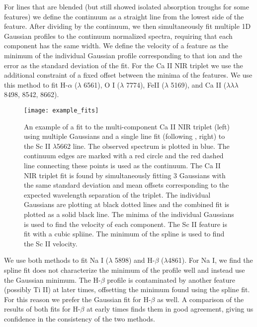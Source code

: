 \documentclass[preprint]{aastex61}
\begin{document}
For lines that are blended (but still showed isolated absorption troughs for some features) we define the continuum as a straight line from the lowest side of the feature. 
After dividing by the continuum, we then simultaneously fit multiple 1D Gaussian profiles to the continuum normalized spectra, requiring that each component has the same width.
We define the velocity of a feature as the minimum of the individual Gaussian profile corresponding to that ion and the error as the standard deviation of the fit. 
For the Ca II NIR triplet we use the additional constraint of a fixed offset between the minima of the features. 
We use this method to fit H-$\alpha$ ($\lambda$ 6561), O I ($\lambda$ 7774), FeII ($\lambda$ 5169), and Ca II ($\lambda\lambda\lambda$ 8498, 8542, 8662). 
\begin{figure}[htbp]
\begin{center}
\texttt{[image: example\_fits]}
\caption{An example of a fit to the multi-component Ca II NIR triplet (left) using multiple Gaussians and a single line fit (following \citet{2012silverman}, right) to the Sc II $\lambda$5662 line.
The observed spectrum is plotted in blue.
The continuum edges are marked with a red circle and the red dashed line connecting these points is used as the continuum. 
The Ca II NIR triplet fit is found by simultaneously fitting 3 Gaussians with the same standard deviation and mean offsets corresponding to the expected wavelength separation of the triplet. 
The individual Gaussians are plotting at black dotted lines and the combined fit is plotted as a solid black line. 
The minima of the individual Gaussians is used to find the velocity of each component.
The Sc II feature is fit with a cubic spliine. 
The minimum of the spline is used to find the Sc II velocity.
}
\label{fig:VelocityFit}
\end{center}
\end{figure}
We use both methods to fit Na I ($\lambda$ 5898) and H-$\beta$ ($\lambda$4861). 
For Na I, we find the spline fit does not characterize the minimum of the profile well and instead use the Gaussian minimum. 
The H-$\beta$ profile is contaminated by another feature (possibly Ti II) at later times, offsetting the minimum found using the spline fit. 
For this reason we prefer the Gaussian fit for H-$\beta$ as well. 
A comparison of the results of both fits for H-$\beta$ at early times finds them in good agreement, giving us confidence in the consistency of the two methods.
\end{document}
